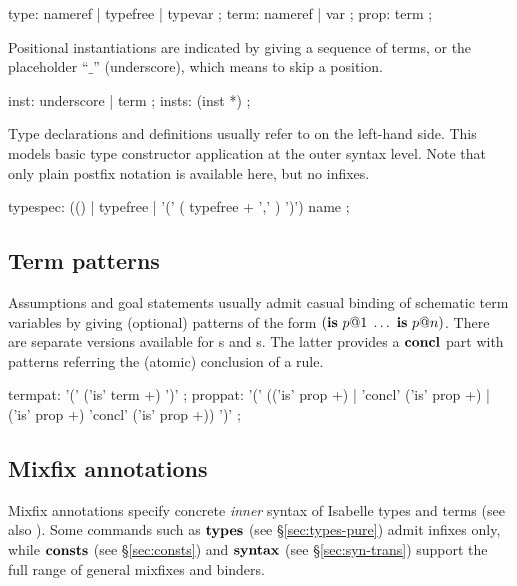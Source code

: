 \begin{rail}
  type: nameref | typefree | typevar
  ;
  term: nameref | var
  ;
  prop: term
  ;
\end{rail}

Positional instantiations are indicated by giving a sequence of terms, or the
placeholder ``$\_$'' (underscore), which means to skip a position.

\begin{rail}
  inst: underscore | term
  ;
  insts: (inst *)
  ;
\end{rail}

Type declarations and definitions usually refer to  on
the left-hand side.  This models basic type constructor application at the
outer syntax level.  Note that only plain postfix notation is available here,
but no infixes.

\begin{rail}
  typespec: (() | typefree | '(' ( typefree + ',' ) ')') name
  ;
\end{rail}


\subsection{Term patterns}\label{sec:term-pats}

Assumptions and goal statements usually admit casual binding of schematic term
variables by giving (optional) patterns of the form $({\mathord{\mathbf{is}}}~p@1\;\dots~{\mathord{\mathbf{is}}}~p@n)$.
There are separate versions available for s and
s.  The latter provides a ${\mathord{\mathbf{concl}}}$ part with patterns
referring the (atomic) conclusion of a rule.

\begin{rail}
  termpat: '(' ('is' term +) ')'
  ;
  proppat: '(' (('is' prop +) | 'concl' ('is' prop +) | ('is' prop +) 'concl' ('is' prop +)) ')'
  ;
\end{rail}


\subsection{Mixfix annotations}

Mixfix annotations specify concrete \emph{inner} syntax of Isabelle types and
terms (see also \cite{isabelle-ref}).  Some commands such as ${\mathord{\mathbf{types}}}$ (see
\S\ref{sec:types-pure}) admit infixes only, while ${\mathord{\mathbf{consts}}}$ (see
\S\ref{sec:consts}) and ${\mathord{\mathbf{syntax}}}$ (see \S\ref{sec:syn-trans})
support the full range of general mixfixes and binders.

